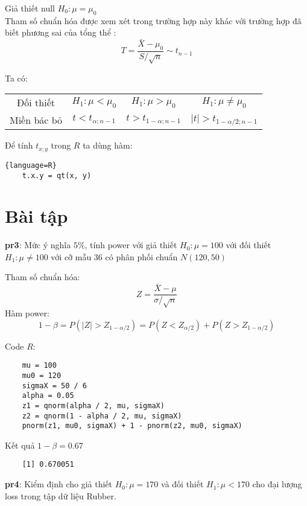 Giả thiết null $H_0: \mu = \mu_0$ \\
Tham số chuẩn hóa được xem xét trong trường hợp này khác với trường hợp đã biết phương sai của tổng thể
:
\begin{equation}
    T = \frac{\bar{X} - \mu_0}{S/ \sqrt{n}} \sim t_{n - 1}    
\end{equation}


Ta có:

\begin{center}
    \begin{tabular}{| c | c | c | c |}
        \hline
        Đối thiết & $H_1: \mu < \mu_0$ & $H_1: \mu > \mu_0$ & $H_1: \mu \neq \mu_0$ \\
        Miền bác bỏ & $t < t_{\alpha; n - 1}$ & $t > t_{1-\alpha; n - 1}$ & $\lvert t \rvert > t_{1 - \alpha / 2; n - 1}$ \\
        \hline
    \end{tabular}
\end{center}

Để tính $t_{x; y}$ trong $R$ ta dùng hàm:

\begin{lstlisting}{language=R}
    t.x.y = qt(x, y)
\end{lstlisting}

\section{Bài tập}
\textbf{pr3}: Mức ý nghĩa $5\%$, tính power với giả thiết $H_0: \mu = 100$ với đối 
thiết $H_1: \mu \neq 100$ với cỡ mẫu 36 có phân phối chuẩn $N(120, 50)$

Tham số chuẩn hóa: 
$$Z = \frac{\bar{X} - \mu}{\sigma / \sqrt{n}}$$
Hàm power: 
$$1 - \beta = P(|Z| > Z_{1 - \alpha / 2}) = P(Z < Z_{\alpha / 2}) + P(Z > Z_{1 - \alpha/2})$$

Code $R$:
\begin{lstlisting}
    mu = 100
    mu0 = 120
    sigmaX = 50 / 6
    alpha = 0.05
    z1 = qnorm(alpha / 2, mu, sigmaX)
    z2 = qnorm(1 - alpha / 2, mu, sigmaX)
    pnorm(z1, mu0, sigmaX) + 1 - pnorm(z2, mu0, sigmaX)
\end{lstlisting}

Kết quả $1- \beta = 0.67$
\begin{lstlisting}
    [1] 0.670051
\end{lstlisting}

\textbf{pr4}: Kiểm định cho giả thiết $H_0: \mu = 170$ và đối thiết $H_1: \mu < 170$
cho đại lượng loss trong tập dữ liệu Rubber.

